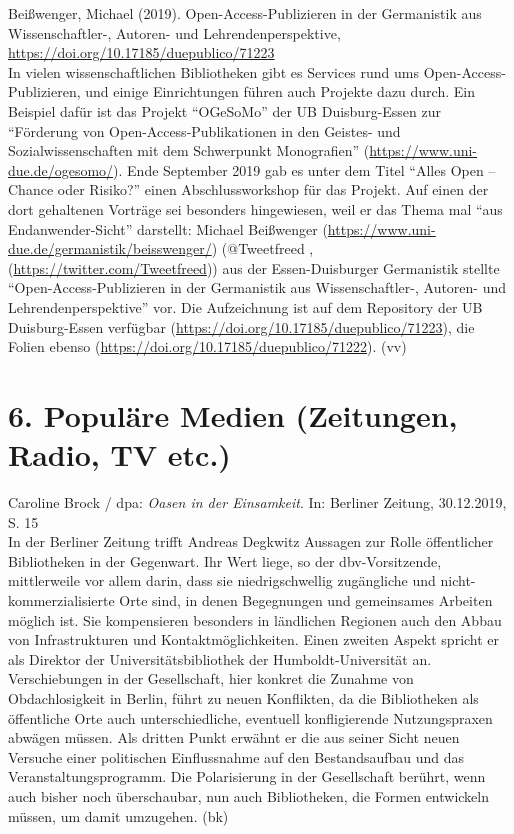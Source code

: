 \documentclass[a4paper,
fontsize=11pt,
oneside,
numbers=noperiodatend,
parskip=half-,
bibliography=totoc,
final
]{scrartcl}
\begin{document}
Beißwenger, Michael (2019). Open-Access-Publizieren in der Germanistik
aus Wissenschaftler-, Autoren- und Lehrendenperspektive,
\url{https://doi.org/10.17185/duepublico/71223}\\
In vielen wissenschaftlichen Bibliotheken gibt es Services rund ums
Open-Access-Publizieren, und einige Einrichtungen führen auch Projekte
dazu durch. Ein Beispiel dafür ist das Projekt ``OGeSoMo'' der UB
Duisburg-Essen zur ``Förderung von Open-Access-Publikationen in den
Geistes- und Sozialwissenschaften mit dem Schwerpunkt Monografien''
(\url{https://www.uni-due.de/ogesomo/}). Ende September 2019 gab es
unter dem Titel ``Alles Open -- Chance oder Risiko?'' einen
Abschlussworkshop für das Projekt. Auf einen der dort gehaltenen
Vorträge sei besonders hingewiesen, weil er das Thema mal ``aus
Endanwender-Sicht'' darstellt: Michael Beißwenger
(\url{https://www.uni-due.de/germanistik/beisswenger/}) (@Tweetfreed ,
(\url{https://twitter.com/Tweetfreed})) aus der Essen-Duisburger
Germanistik stellte ``Open-Access-Publizieren in der Germanistik aus
Wissenschaftler-, Autoren- und Lehrendenperspektive'' vor. Die
Aufzeichnung ist auf dem Repository der UB Duisburg-Essen verfügbar
(\url{https://doi.org/10.17185/duepublico/71223}), die Folien ebenso
(\url{https://doi.org/10.17185/duepublico/71222}). (vv)

\hypertarget{populuxe4re-medien-zeitungen-radio-tv-etc.}{%
\section{6. Populäre Medien (Zeitungen, Radio, TV
etc.)}\label{populuxe4re-medien-zeitungen-radio-tv-etc.}}

Caroline Brock / dpa: \emph{Oasen in der Einsamkeit}. In: Berliner
Zeitung, 30.12.2019, S. 15\\
In der Berliner Zeitung trifft Andreas Degkwitz Aussagen zur Rolle
öffentlicher Bibliotheken in der Gegenwart. Ihr Wert liege, so der
dbv-Vorsitzende, mittlerweile vor allem darin, dass sie niedrigschwellig
zugängliche und nicht-kommerzialisierte Orte sind, in denen Begegnungen
und gemeinsames Arbeiten möglich ist. Sie kompensieren besonders in
ländlichen Regionen auch den Abbau von Infrastrukturen und
Kontaktmöglichkeiten. Einen zweiten Aspekt spricht er als Direktor der
Universitätsbibliothek der Humboldt-Universität an. Verschiebungen in
der Gesellschaft, hier konkret die Zunahme von Obdachlosigkeit in
Berlin, führt zu neuen Konflikten, da die Bibliotheken als öffentliche
Orte auch unterschiedliche, eventuell konfligierende Nutzungspraxen
abwägen müssen. Als dritten Punkt erwähnt er die aus seiner Sicht neuen
Versuche einer politischen Einflussnahme auf den Bestandsaufbau und das
Veranstaltungsprogramm. Die Polarisierung in der Gesellschaft berührt,
wenn auch bisher noch überschaubar, nun auch Bibliotheken, die Formen
entwickeln müssen, um damit umzugehen. (bk)
\end{document}

